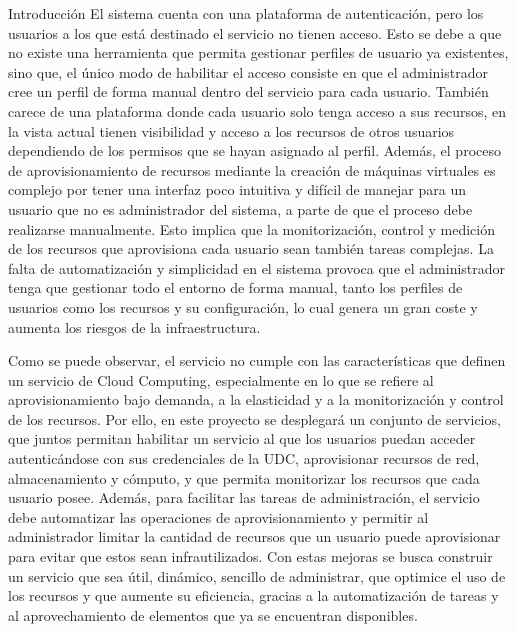 \begin{chapter}{Introducción}
El sistema cuenta con una plataforma de autenticación, pero los usuarios a los que está destinado el servicio no tienen acceso. Esto se debe a que no existe una herramienta que permita gestionar perfiles de usuario ya existentes, sino que, el único modo de habilitar el acceso consiste en que el administrador cree un perfil de forma manual dentro del servicio para cada usuario. También carece de una plataforma donde cada usuario solo tenga acceso a sus recursos, en la vista actual tienen visibilidad y acceso a los recursos de otros usuarios dependiendo de los permisos que se hayan asignado al perfil. Además, el proceso de aprovisionamiento de recursos mediante la creación de máquinas virtuales es complejo por tener una interfaz poco intuitiva y difícil de manejar para un usuario que no es administrador del sistema, a parte de que el proceso debe realizarse manualmente. Esto implica que la monitorización, control y medición de los recursos que aprovisiona cada usuario sean también tareas complejas. La falta de automatización y simplicidad en el sistema provoca que el administrador tenga que gestionar todo el entorno de forma manual, tanto los perfiles de usuarios como los recursos y su configuración, lo cual genera un gran coste y aumenta los riesgos de la infraestructura.

Como se puede observar, el servicio no cumple con las características que definen un servicio de Cloud Computing, especialmente en lo que se refiere al aprovisionamiento bajo demanda, a la elasticidad y a la monitorización y control de los recursos. Por ello, en este proyecto se desplegará un conjunto de servicios, que juntos permitan habilitar un servicio al que los usuarios puedan acceder autenticándose con sus credenciales de la UDC, aprovisionar recursos de red, almacenamiento y cómputo, y que permita monitorizar los recursos que cada usuario posee. Además, para facilitar las tareas de administración, el servicio debe automatizar las operaciones de aprovisionamiento y permitir al administrador limitar la cantidad de recursos que un usuario puede aprovisionar para evitar que estos sean infrautilizados.
Con estas mejoras se busca construir un servicio que sea útil, dinámico, sencillo de administrar, que optimice el uso de los recursos y que aumente su eficiencia, gracias a la automatización de tareas y al aprovechamiento de elementos que ya se encuentran disponibles.


\end{chapter}
